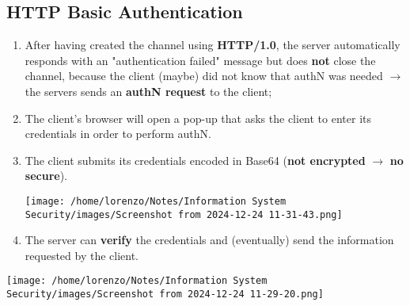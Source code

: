 \subsection{HTTP Basic Authentication}
\begin{minipage}{0.5\textwidth}
    \begin{enumerate}
        \item After having created the channel using \textbf{HTTP/1.0}, the server automatically responds
        with an "authentication failed" message but does \textbf{not} close the channel, because the client (maybe) did not know that authN was needed \(\rightarrow\) the servers sends an \textbf{authN request} to the client;
        \item The client's browser will open a pop-up that asks the client to enter its credentials in order to perform authN.
        \item The client submits its credentials encoded in Base64 (\textbf{not encrypted} \(\rightarrow\) \textbf{no secure}).
        
            \texttt{[image: /home/lorenzo/Notes/Information System Security/images/Screenshot from 2024-12-24 11-31-43.png]}

        \item The server can \textbf{verify} the credentials and (eventually) send the information requested by the client. 
    \end{enumerate}
\end{minipage} 
\hspace{0.2cm}
\begin{minipage}{0.5\textwidth}
    \centering
    \texttt{[image: /home/lorenzo/Notes/Information System Security/images/Screenshot from 2024-12-24 11-29-20.png]}
\end{minipage}

